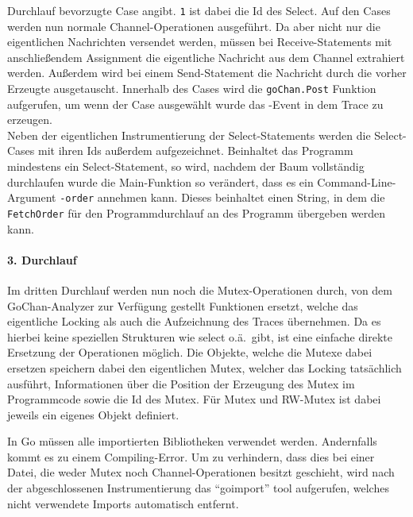 Durchlauf bevorzugte Case angibt. \texttt{1} ist dabei die Id des 
Select. Auf den Cases werden nun normale 
Channel-Operationen ausgeführt. Da aber nicht nur die eigentlichen 
Nachrichten versendet werden, müssen bei Receive-Statements mit anschließendem 
Assignment die eigentliche Nachricht aus dem Channel extrahiert werden. Außerdem 
wird bei einem Send-Statement die Nachricht durch die vorher Erzeugte ausgetauscht.
Innerhalb des Cases wird die \texttt{goChan.Post} Funktion aufgerufen, um wenn 
der Case ausgewählt wurde das -Event in dem Trace zu erzeugen.\\
Neben der eigentlichen Instrumentierung der Select-Statements werden die Select-
Cases mit ihren Ids außerdem aufgezeichnet. Beinhaltet das Programm mindestens 
ein Select-Statement, so wird, nachdem der Baum vollständig durchlaufen wurde 
die Main-Funktion so verändert, dass es ein Command-Line-Argument \texttt{-order}
annehmen kann. Dieses beinhaltet einen String, in dem die \texttt{FetchOrder} für
den Programmdurchlauf an des Programm übergeben werden kann.
\paragraph{3. Durchlauf} Im dritten Durchlauf werden nun noch die Mutex-Operationen 
durch, von dem GoChan-Analyzer zur Verfügung gestellt Funktionen ersetzt, 
welche das eigentliche Locking als auch die Aufzeichnung des Traces übernehmen. 
Da es hierbei keine speziellen Strukturen wie select o.ä.\ gibt, ist eine 
einfache direkte Ersetzung der Operationen möglich. Die Objekte, welche die 
Mutexe dabei ersetzen speichern dabei den eigentlichen Mutex, welcher 
das Locking tatsächlich ausführt, Informationen über die Position der Erzeugung des 
Mutex im Programmcode sowie die Id des Mutex. Für Mutex und RW-Mutex 
ist dabei jeweils ein eigenes Objekt definiert.

In Go 
müssen alle importierten Bibliotheken verwendet werden. Andernfalls kommt es 
zu einem Compiling-Error. Um zu verhindern, dass dies bei einer Datei, die weder
Mutex noch Channel-Operationen besitzt geschieht, wird nach der abgeschlossenen 
Instrumentierung das ``goimport'' tool aufgerufen, welches nicht verwendete Imports 
automatisch entfernt.


